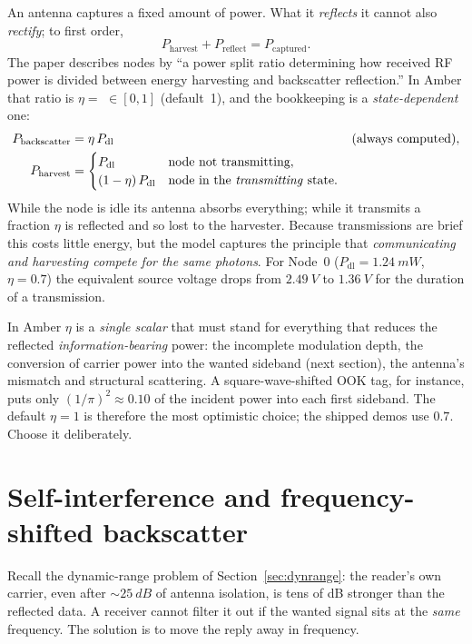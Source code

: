 An antenna captures a fixed amount of power. What it \emph{reflects} it
cannot also \emph{rectify}; to first order,
\[
 P_{\mathrm{harvest}} + P_{\mathrm{reflect}} = P_{\mathrm{captured}}.
\]
The paper describes nodes by ``a power split ratio determining how received RF
power is divided between energy harvesting and backscatter reflection.'' In Amber
that ratio is $\eta=$  $\in[0,1]$ (default~1), and the
bookkeeping is a \emph{state-dependent} one:
\begin{align}
 P_{\mathrm{backscatter}} &= \eta\,P_{\mathrm{dl}} && \text{(always computed)},\\
 P_{\mathrm{harvest}} &=
 \begin{cases}
  P_{\mathrm{dl}} & \text{node not transmitting},\\
  (1-\eta)\,P_{\mathrm{dl}} & \text{node in the \emph{transmitting} state.}
 \end{cases}
\end{align}
While the node is idle its antenna absorbs everything; while it
transmits a fraction $\eta$ is reflected and so lost to the harvester. Because
transmissions are brief this costs little energy, but the model captures the
principle that \emph{communicating and harvesting compete for the same photons}.
For Node~0 ($P_{\mathrm{dl}}=\SI{1.24}{mW}$, $\eta=0.7$) the equivalent
source voltage drops from $\SI{2.49}{V}$ to $\SI{1.36}{V}$ for the duration of a transmission.

\begin{reality}
In Amber $\eta$ is a \emph{single scalar} that must stand for everything that
reduces the reflected \emph{information-bearing} power: the incomplete modulation depth,
the conversion of carrier power into the wanted sideband (next section),
the antenna's mismatch and structural scattering. A square-wave-shifted OOK
tag, for instance, puts only $(1/\pi)^2\approx0.10$ of the incident power into
each first sideband. The default $\eta=1$ is therefore the most optimistic choice;
the shipped demos use $0.7$. Choose it deliberately.
\end{reality}

\section{Self-interference and frequency-shifted backscatter}
\label{sec:selfint}

Recall the dynamic-range problem of Section~\ref{sec:dynrange}: the reader's own
carrier, even after $\sim\SI{25}{dB}$ of antenna isolation, is tens of dB stronger
than the reflected data. A receiver cannot filter it out if the wanted signal sits
at the \emph{same} frequency. The solution is to move the reply away
in frequency.

